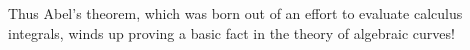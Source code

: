 Thus Abel's theorem, which was born out of an effort to evaluate calculus integrals, winds up proving a basic fact in the theory of algebraic curves!

%
%
%
%
%
%
